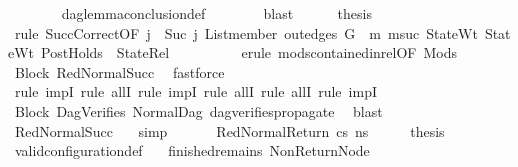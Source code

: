\begin{isabellebody}
\ \ \ \ \ \ \isamarkupfalse%
\ dag{\isacharunderscore}{\kern0pt}lemma{\isacharunderscore}{\kern0pt}conclusion{\isacharunderscore}{\kern0pt}def\isanewline
\ \ \ \ \ \ \isamarkupfalse%
\ blast\isanewline
\ \ \ \ \isamarkupfalse%
\ {\isacharquery}{\kern0pt}thesis\isanewline
\ \ \ \ \ \ \isamarkupfalse%
\ {\isacharparenleft}{\kern0pt}rule\ SuccCorrect{\isacharbrackleft}{\kern0pt}OF\ {\isacartoucheopen}j\ {\isacharequal}{\kern0pt}\ Suc\ j{\isacharprime}{\kern0pt}{\isacartoucheclose}\ {\isacartoucheopen}List{\isachardot}{\kern0pt}member\ {\isacharparenleft}{\kern0pt}out{\isacharunderscore}{\kern0pt}edges\ G{}\ {\isacharbang}{\kern0pt}\ m{}{\isacharparenright}{\kern0pt}\ msuc{\isacartoucheclose}\ StateWt\ StateWt{}\ PostHolds\ {\isacharunderscore}{\kern0pt}\ StateRel{\isacharbrackright}{\kern0pt}{\isacharparenright}{\kern0pt}\isanewline
\ \ \ \ \ \ \ \ \isamarkupfalse%
\ {\isacharparenleft}{\kern0pt}erule\ mods{\isacharunderscore}{\kern0pt}contained{\isacharunderscore}{\kern0pt}in{\isacharunderscore}{\kern0pt}rel{\isacharbrackleft}{\kern0pt}OF\ Mods{\isacharbrackright}{\kern0pt}{\isacharparenright}{\kern0pt}\isanewline
\ \ \ \ \ \ \isamarkupfalse%
\ Block\ RedNormalSucc\ \isamarkupfalse%
\ fastforce\isanewline
\ \ \ \ \ \ \ \isamarkupfalse%
\ {\isacharparenleft}{\kern0pt}rule\ impI{\isacharcomma}{\kern0pt}\ rule\ allI{\isacharcomma}{\kern0pt}\ rule\ impI{\isacharcomma}{\kern0pt}\ rule\ allI{\isacharcomma}{\kern0pt}\ rule\ allI{\isacharcomma}{\kern0pt}\ rule\ impI{\isacharparenright}{\kern0pt}\isanewline
\ \ \ \ \ \ \isamarkupfalse%
\ Block{}\ DagVerifies\ NormalDag\ dag{\isacharunderscore}{\kern0pt}verifies{\isacharunderscore}{\kern0pt}propagate\ \isamarkupfalse%
\ blast\isanewline
\ \ \ \ \ \ \isamarkupfalse%
\ RedNormalSucc\ {}\ \isamarkupfalse%
\ simp\isanewline
\ \ \isamarkupfalse%
\isanewline
\ \ \isamarkupfalse%
\ {\isacharparenleft}{\kern0pt}RedNormalReturn\ cs\ ns{\isacharprime}{\kern0pt}{\isacharparenright}{\kern0pt}\isanewline
\ \ \isamarkupfalse%
\ \isamarkupfalse%
\ {\isacharquery}{\kern0pt}thesis\ \isamarkupfalse%
\ valid{\isacharunderscore}{\kern0pt}configuration{\isacharunderscore}{\kern0pt}def\ \isamarkupfalse%
\ {}\ finished{\isacharunderscore}{\kern0pt}remains\ NonReturnNode\isanewline

\end{isabellebody}
